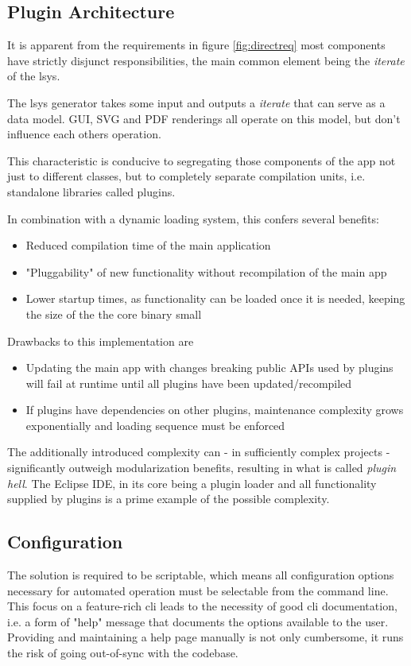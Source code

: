 \subsection{Plugin Architecture}\label{sec:resplug}
It is apparent from the requirements in figure \ref{fig:directreq} most components have strictly disjunct responsibilities, the main common element being the \textit{iterate} of the \gls{lsys}.

The \gls{lsys} generator takes some input and outputs a \textit{iterate} that can serve as a data model. GUI, SVG and PDF renderings all operate on this model, but don't influence each others operation.

This characteristic is conducive to segregating those components of the app not just to different classes, but to completely separate compilation units, i.e. standalone libraries called plugins.

In combination with a dynamic loading system, this confers several benefits:

\begin{itemize}
	\item  Reduced compilation time of the main application
	\item  "Pluggability" of new functionality without recompilation of the main app
	\item  Lower startup times, as functionality can be loaded once it is needed, keeping the size of the the core binary small
\end{itemize}

Drawbacks to this implementation are
\begin{itemize}
	\item Updating the main app with changes breaking public APIs used by plugins will fail at runtime until all plugins have been updated/recompiled
	\item If plugins have dependencies on other plugins, maintenance complexity grows exponentially and loading sequence must be enforced
\end{itemize}

The additionally introduced complexity can - in sufficiently complex projects - significantly outweigh modularization benefits, resulting in what is called \textit{plugin hell}.
The Eclipse IDE, in its core being a plugin loader and all functionality supplied by plugins is a prime example of the possible complexity.



\subsection{Configuration}
The solution is required to be scriptable, which means all configuration options necessary for automated operation must be selectable from the command line.
This focus on a feature-rich \gls{cli} leads to the necessity of good \gls{cli} documentation, i.e. a form of "help" message that documents the options available to the user.
Providing and maintaining a help page manually is not only cumbersome, it runs the risk of going out-of-sync with the codebase.

